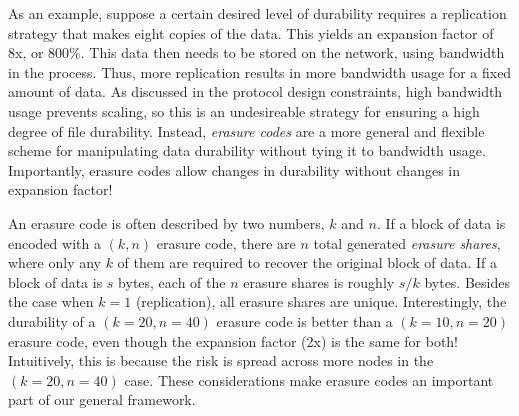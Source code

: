 \documentclass[a4paper,10pt]{article} \usepackage[utf8]{inputenc}
\begin{document}
As an example, suppose a certain desired level of durability requires a
replication strategy that makes eight copies of the data. This yields an
expansion factor of 8x, or 800\%. This data then needs to be stored on the
network, using bandwidth in the process. Thus, more replication results in more
bandwidth usage for a fixed amount of data. As discussed in the protocol design
constraints, high bandwidth usage prevents scaling, so this is an undesireable
strategy for ensuring a high degree of file durability. Instead, {\em erasure
codes} are a more general and flexible scheme for manipulating data
durability without tying it to bandwidth usage. Importantly, erasure codes allow
changes in durability without changes in expansion factor!

An erasure code is often described by two numbers, $k$ and $n$. If a block of
data is encoded with a $(k,n)$ erasure code, there are $n$ total generated {\em
erasure shares}, where only any $k$ of them are required to recover the original
block of data. If a block of data is $s$ bytes, each of the $n$ erasure shares
is roughly $s/k$ bytes. Besides the case when $k=1$ (replication), all erasure
shares are unique. Interestingly, the durability of a $(k=20,n=40)$ erasure code
is better than a $(k=10,n=20)$ erasure code, even though the expansion factor
(2x) is the same for both! Intuitively, this is because the risk is spread
across more nodes in the $(k=20,n=40)$ case. These considerations make erasure
codes an important part of our general framework.

\end{document}

